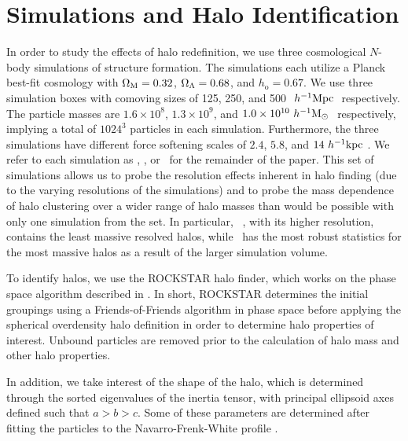 \documentclass[usenatbib,usegraphicx,letterpaper]{mn2e}
\begin{document}
\section[]{Simulations and Halo Identification}
\label{section:data}

In order to study the effects of halo redefinition, we use three cosmological $N$-body simulations of structure formation. The \citet{diemer15} simulations each utilize a Planck best-fit cosmology with $\Omega_{\mathrm{M}} = 0.32$, $\Omega_{\Lambda} = 0.68$, and $h_{\mathrm{o}} = 0.67$. We use three simulation boxes with comoving sizes of 125, 250, and 500 $\ h^{-1}\mathrm{Mpc}~$ respectively. The particle masses are $1.6 \times 10^8$, $1.3 \times 10^9$, and $1.0 \times 10^{10} \ h^{-1}\mathrm{M}_{\odot}~$ respectively, implying a total of $1024^3$ particles in each simulation. Furthermore, the three simulations have different force softening scales of $2.4$, $5.8$, and $14 \ h^{-1}\mathrm{kpc}~$. We refer to each simulation as \simA, \simB, or \simC  \ for the remainder of the paper. This set of simulations allows us to probe the resolution effects inherent in halo finding (due to the varying resolutions of the simulations) and to probe the mass dependence of halo clustering over a wider range of halo masses than would be possible with only one simulation from the set. In particular, \simA~, with its higher resolution, contains the least massive resolved halos, while \simC~has the most robust statistics for the most massive halos as a result of the larger simulation volume.

To identify halos, we use the ROCKSTAR halo finder, which works on the phase space algorithm described in \citet*{behroozi13}. In short, ROCKSTAR determines the initial groupings using a Friends-of-Friends algorithm in phase space before applying the spherical overdensity halo definition in order to determine halo properties of interest. Unbound particles are removed prior to the calculation of halo mass and other halo properties. 

In addition, we take interest of the shape of the halo, which is determined through the sorted eigenvalues of the inertia tensor, with principal ellipsoid axes defined such that $a >b > c$. Some of these parameters are determined after fitting the particles to the Navarro-Frenk-White profile \citet*{nfw97}.
\end{document}
